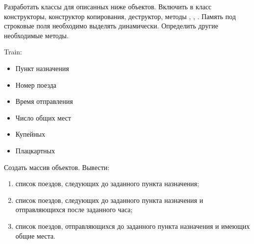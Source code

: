 
Разработать классы для описанных ниже объектов. Включить в класс
конструкторы, конструктор копирования, деструктор, методы ,
, . Память под строковые поля необходимо выделять
динамически. Определить другие необходимые методы.

Train:
\begin{itemize}
	\item Пункт назначения
	\item Номер поезда
	\item Время отправления
	\item Число общих мест
	\item Купейных
	\item Плацкартных
\end{itemize}

Создать массив объектов. Вывести:
\begin{enumerate}
	\item список поездов, следующих до заданного пункта назначения;
	\item список поездов, следующих до заданного пункта назначения и отправляющихся после заданного часа;
	\item список поездов, отправляющихся до заданного пункта назначения и имеющих общие места.
\end{enumerate}
